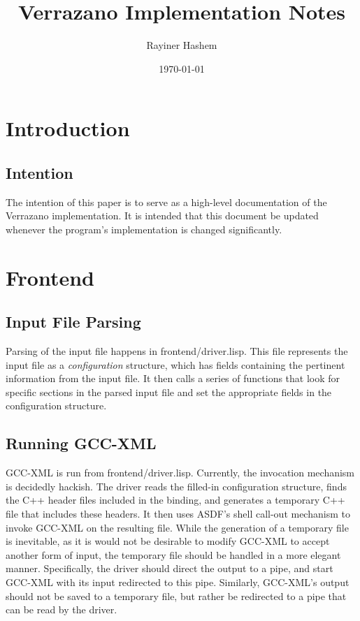 \documentclass[12pt]{article}
\begin{document}
\title{Verrazano Implementation Notes}
\author{Rayiner Hashem}
\date{\today}
\maketitle

\section{Introduction}

\subsection{Intention}
The intention of this paper is to serve as a high-level documentation of the Verrazano implementation. It is intended that this document be updated whenever the program's implementation is changed significantly.

\section{Frontend}

\subsection{Input File Parsing}
Parsing of the input file happens in frontend/driver.lisp. This file represents the input file as a \emph{configuration} structure, which has fields containing the pertinent information from the input file. It then calls a series of functions that look for specific sections in the parsed input file and set the appropriate fields in the configuration structure. 

\subsection{Running GCC-XML}
GCC-XML is run from frontend/driver.lisp. Currently, the invocation mechanism is decidedly hackish. The driver reads the filled-in configuration structure, finds the C++ header files included in the binding, and generates a temporary C++ file that includes these headers. It then uses ASDF's shell call-out mechanism to invoke GCC-XML on the resulting file. While the generation of a temporary file is inevitable, as it is would not be desirable to modify GCC-XML to accept another form of input, the temporary file should be handled in a more elegant manner. Specifically, the driver should direct the output to a pipe, and start GCC-XML with its input redirected to this pipe. Similarly, GCC-XML's output should not be saved to a temporary file, but rather be redirected to a pipe that can be read by the driver.
\end{document}
